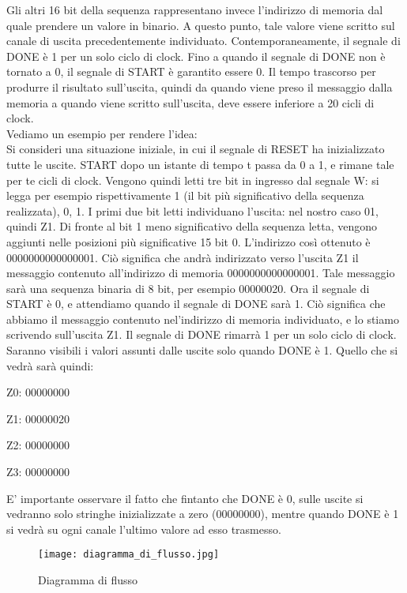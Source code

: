 \documentclass{article}
\begin{document}
\noindent Gli altri 16 bit della sequenza rappresentano invece l'indirizzo di memoria dal quale prendere un valore in binario. A questo punto, tale valore viene scritto sul canale di uscita precedentemente individuato. Contemporaneamente, il segnale di DONE è 1 per un solo ciclo di clock. Fino a quando il segnale di DONE non è tornato a 0, il segnale di START è garantito essere 0. Il tempo trascorso per produrre il risultato sull'uscita, quindi da quando viene preso il messaggio dalla memoria a quando viene scritto sull'uscita, deve essere inferiore a 20 cicli di clock. \\
Vediamo un esempio per rendere l'idea:\\
Si consideri una situazione iniziale, in cui il segnale di RESET ha inizializzato tutte le uscite. START dopo un istante di tempo t passa da 0 a 1, e rimane tale per te cicli di clock. Vengono quindi letti tre bit in ingresso dal segnale W: si legga per esempio rispettivamente 1 (il bit più significativo della sequenza realizzata), 0, 1. I primi due bit letti individuano l'uscita: nel nostro caso 01, quindi Z1. Di fronte al bit 1 meno significativo della sequenza letta, vengono aggiunti nelle posizioni più significative 15 bit 0. L'indirizzo così ottenuto è 0000000000000001. Ciò significa che andrà indirizzato verso l'uscita Z1 il messaggio contenuto all'indirizzo di memoria 0000000000000001. Tale messaggio sarà una sequenza binaria di 8 bit, per esempio 00000020. Ora il segnale di START è 0, e attendiamo quando il segnale di DONE sarà 1. Ciò significa che abbiamo il messaggio contenuto nel'indirizzo di memoria individuato, e lo stiamo scrivendo sull'uscita Z1. Il segnale di DONE rimarrà 1 per un solo ciclo di clock. Saranno visibili i valori assunti dalle uscite solo quando DONE è 1. Quello che si vedrà sarà quindi:

Z0: 00000000

Z1: 00000020

Z2: 00000000

Z3: 00000000

\noindent E' importante osservare il fatto che fintanto che DONE è 0, sulle uscite si vedranno solo stringhe inizializzate a zero (00000000), mentre quando DONE è 1 si vedrà su ogni canale l'ultimo valore ad esso trasmesso.

\begin{figure}[H]
\centerline{\texttt{[image: diagramma\_di\_flusso.jpg]}}
\caption{Diagramma di flusso}
\label{fig}
\end{figure}
\end{document}
